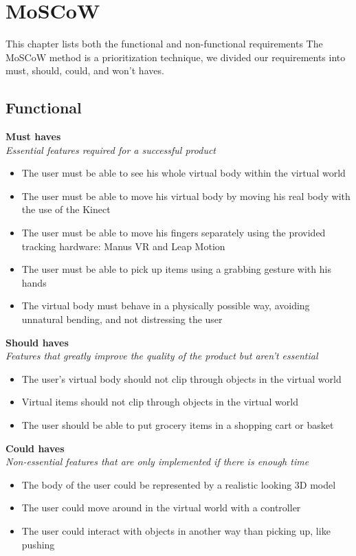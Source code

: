 \documentclass[11pt,a4paper]{report}
\begin{document}
\chapter{MoSCoW}
This chapter lists both the functional and non-functional requirements
The MoSCoW method is a prioritization technique, we divided our requirements into must, should, could, and won't haves. 
\section{Functional}
\textbf{Must haves} \\
\textit{Essential features required for a successful product}
\begin{itemize}
\item The user must be able to see his whole virtual body within the virtual world
\item The user must be able to move his virtual body by moving his real body with the use of the Kinect
\item  The user must be able to move his fingers separately using the provided tracking hardware:
Manus VR and Leap Motion
\item The user must be able to pick up items using a grabbing gesture with his hands
\item The virtual body must behave in a physically possible way, avoiding unnatural bending, and not
distressing the user
\end{itemize}
\textbf{Should haves} \\
\textit{Features that greatly improve the quality of the product but aren't essential}
\begin{itemize}
\item The user’s virtual body should not clip through objects in the virtual world
\item Virtual items should not clip through objects in the virtual world
\item The user should be able to put grocery items in a shopping cart or basket
\end{itemize}  \newpage
\textbf{Could haves} \\
\textit{Non-essential features that are only implemented if there is enough time}
\begin{itemize}
\item The body of the user could be represented by a realistic looking 3D model
\item The user could move around in the virtual world with a controller
\item The user could interact with objects in another way than picking up, like pushing
\end{itemize}
\end{document}
